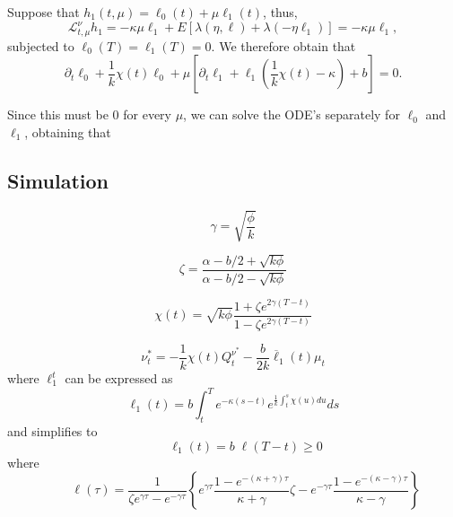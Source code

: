 Suppose that $h_1(t,\mu)= \ell_0 (t) + \mu \ell_1(t)$,
thus,
\begin{displaymath}
  \mathcal L^\nu_{t,\mu} h_1 = -\kappa \mu \ell_1 + E[\lambda(\eta,\ell) + \lambda(-\eta \ell_1)] =
  -\kappa \mu \ell_1,
\end{displaymath}
subjected to $\ell_0(T)=\ell_1(T)=0$. We therefore obtain that
\begin{displaymath}
  \partial_t \ell_0 + \frac{1}{k} \chi(t)\ell_0 +
  \mu\left[
  \partial_t \ell_1 + \ell_1\left(
    \frac{1}{k} \chi(t) - \kappa
    \right) + b
    \right] = 0.
\end{displaymath}

Since this must be 0 for every $\mu$, we can solve the ODE's separately 
for $\ell_0$ and $\ell_1$, obtaining that



\subsection{Simulation}

\begin{displaymath}
	\gamma = \sqrt{\frac{\phi}{k}}
\end{displaymath}

\begin{displaymath}
	\zeta = \frac{\alpha -b/2 + \sqrt{k \phi}}{\alpha -b/2 - \sqrt{k \phi}}
\end{displaymath}

\begin{displaymath}
	\chi(t) = \sqrt{k \phi} \frac{1+\zeta e^{2\gamma(T-t)}}{1-\zeta e^{2\gamma(T-t)}}
\end{displaymath}

\begin{displaymath}
	\nu_{t}^{*}=-\frac{1}{k} \chi(t) Q_{t}^{\nu^{*}}-\frac{b}{2 k} \overline{\ell}_{1}(t) \mu_{t}
\end{displaymath}
where $\ell_{1}^{t}$ can be expressed as
\begin{displaymath}
	\ell_{1}(t)=b \int_{t}^{T} e^{-\kappa(s-t)} e^{\frac{1}{k} \int_{t}^{s}\chi(u) d u}  d s
\end{displaymath}
and  simplifies to
\begin{displaymath}
	{\qquad \ell_{1}(t)=b \;\ell(T-t) \geq 0}
\end{displaymath}
where
\begin{displaymath}
	{\qquad \ell(\tau)=\frac{1}{\zeta e^{\gamma \tau}-e^{-\gamma \tau}}\left\{e^{\gamma \tau} \frac{1-e^{-(\kappa+\gamma) \tau}}{\kappa+\gamma} \zeta-e^{-\gamma \tau} \frac{1-e^{-(\kappa-\gamma) \tau}}{\kappa-\gamma}\right\}}
\end{displaymath}

